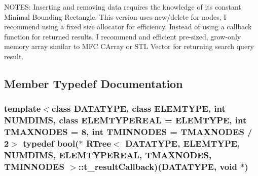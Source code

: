 N\-O\-T\-E\-S\-: Inserting and removing data requires the knowledge of its constant Minimal Bounding Rectangle. This version uses new/delete for nodes, I recommend using a fixed size allocator for efficiency. Instead of using a callback function for returned results, I recommend and efficient pre-\/sized, grow-\/only memory array similar to M\-F\-C C\-Array or S\-T\-L Vector for returning search query result. 

\subsection{Member Typedef Documentation}
\hypertarget{classRTree_a989db5f20fcdc26231e8b76be83caee4}{
\subsubsection[{t\-\_\-result\-Callback}]{\setlength{\rightskip}{0pt plus 5cm}template$<$class D\-A\-T\-A\-T\-Y\-P\-E, class E\-L\-E\-M\-T\-Y\-P\-E, int N\-U\-M\-D\-I\-M\-S, class E\-L\-E\-M\-T\-Y\-P\-E\-R\-E\-A\-L = E\-L\-E\-M\-T\-Y\-P\-E, int T\-M\-A\-X\-N\-O\-D\-E\-S = 8, int T\-M\-I\-N\-N\-O\-D\-E\-S = T\-M\-A\-X\-N\-O\-D\-E\-S / 2$>$ typedef bool($\ast$ {\bf R\-Tree}$<$ D\-A\-T\-A\-T\-Y\-P\-E, E\-L\-E\-M\-T\-Y\-P\-E, N\-U\-M\-D\-I\-M\-S, E\-L\-E\-M\-T\-Y\-P\-E\-R\-E\-A\-L, T\-M\-A\-X\-N\-O\-D\-E\-S, T\-M\-I\-N\-N\-O\-D\-E\-S $>$\-::t\-\_\-result\-Callback)(D\-A\-T\-A\-T\-Y\-P\-E, void $\ast$)}}\label{classRTree_a989db5f20fcdc26231e8b76be83caee4}


